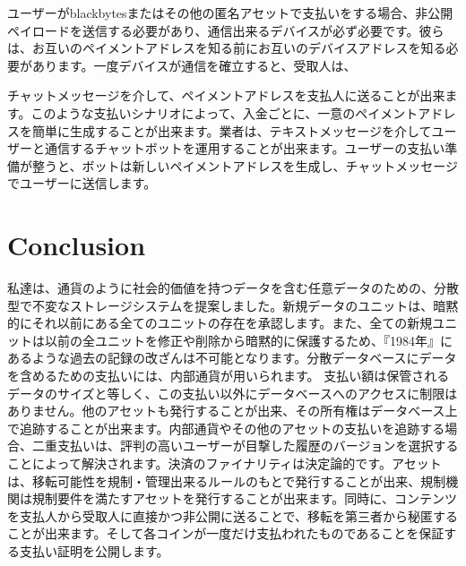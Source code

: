 \documentclass[a4paper, dvipdfmx]{jsarticle}
\begin{document}
ユーザーがblackbytesまたはその他の匿名アセットで支払いをする場合、非公開ペイロードを送信する必要があり、通信出来るデバイスが必ず必要です。彼らは、お互いのペイメントアドレスを知る前にお互いのデバイスアドレスを知る必要があります。一度デバイスが通信を確立すると、受取人は、

チャットメッセージを介して、ペイメントアドレスを支払人に送ることが出来ます。このような支払いシナリオによって、入金ごとに、一意のペイメントアドレスを簡単に生成することが出来ます。業者は、テキストメッセージを介してユーザーと通信するチャットボットを運用することが出来ます。ユーザーの支払い準備が整うと、ボットは新しいペイメントアドレスを生成し、チャットメッセージでユーザーに送信します。

\section{Conclusion}
私達は、通貨のように社会的価値を持つデータを含む任意データのための、分散型で不変なストレージシステムを提案しました。新規データのユニットは、暗黙的にそれ以前にある全てのユニットの存在を承認します。また、全ての新規ユニットは以前の全ユニットを修正や削除から暗黙的に保護するため、『1984年』にあるような過去の記録の改ざんは不可能となります。分散データベースにデータを含めるための支払いには、内部通貨が用いられます。 支払い額は保管されるデータのサイズと等しく、この支払い以外にデータベースへのアクセスに制限はありません。他のアセットも発行することが出来、その所有権はデータベース上で追跡することが出来ます。内部通貨やその他のアセットの支払いを追跡する場合、二重支払いは、評判の高いユーザーが目撃した履歴のバージョンを選択することによって解決されます。決済のファイナリティは決定論的です。アセットは、移転可能性を規制・管理出来るルールのもとで発行することが出来、規制機関は規制要件を満たすアセットを発行することが出来ます。同時に、コンテンツを支払人から受取人に直接かつ非公開に送ることで、移転を第三者から秘匿することが出来ます。そして各コインが一度だけ支払われたものであることを保証する支払い証明を公開します。

\vspace{20pt}
\end{document}
